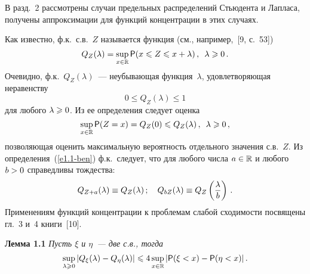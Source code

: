 \begin{multicols}{2}
В разд.~2 рассмотрены случаи предельных распределений Стьюдента и
Лапласа, получены аппроксимации для функций концентрации в этих
случаях.

Как известно, ф.к.\ с.в.\ $Z$ называется функция (см., например,~[9, с.~53])
\begin{equation}
Q_Z(\lambda)=\sup_{x\in\mathbb{R}}{\sf P}(x\leqslant Z\leqslant x+\lambda)\,,\enskip \lambda
\geqslant 0\,.
\label{e1.1-ben}
\end{equation}
Очевидно, ф.к.\ $Q_Z(\lambda)$~--- неубывающая функция~$\lambda$,
удовлетворяющая неравенству
$$
0\leqslant Q_Z(\lambda)\leqslant 1
$$
для любого  $\lambda\hm\geqslant0$. Из  ее определения следует оценка
\begin{equation*}
\sup\limits_{x\in\mathbb{R}}{\sf P}(Z= x)=Q_Z(0)\leqslant Q_Z(\lambda)\,,\enskip
\lambda\geqslant0\,,
\end{equation*}
позволяющая оценить максимальную вероятность отдельного значения
с.в.~$Z$. Из определения~(\ref{e1.1-ben}) ф.к.\ следует, что для любого числа
$a\hm\in\r$    и любого $b\hm>0$  справедливы тождества:
\begin{equation*}
Q_{Z+a}(\lambda)\equiv Q_Z(\lambda)\,;\quad  Q_{bZ}(\lambda)\equiv
Q_Z\left(\displaystyle\frac{\displaystyle \lambda\mathstrut}{\displaystyle b\mathstrut}\right)\,.
\end{equation*}
Применениям функций концентрации к проблемам слабой сходимости
посвящены гл.~3 и~4 книги~[10].

\medskip

\noindent
\textbf{Лемма 1.1} {\it Пусть $\xi$ и $\eta$~--- две с.в.,
тогда}
$$
\sup\limits_{\lambda\geqslant0}|Q_{\xi}(\lambda)-Q_{\eta}(\lambda)|\leqslant  4
\sup\limits_{x\in\mathbb{R}}|{\sf P}(\xi<x)-{\sf P}(\eta<x)|\,.
$$


\smallskip


\end{multicols}
